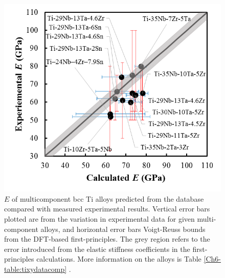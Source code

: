 \pagebreak
\begin{figure}[H]
	\centering
	\includegraphics{Chapter-6/Figures/tixydatabase.png}
	\caption{$E$ of multicomponent bcc Ti alloys predicted from the database compared with measured experimental results. Vertical error bars plotted are from the variation in experimental data for given multi-component alloys, and horizontal error bars Voigt-Reuss bounds from the DFT-based first-principles. The grey region refers to the error introduced from the elastic stiffness coefficients in the first-principles calculations. More information on the alloys is Table \ref{Ch6-table:tixydatacomp} \cite{Mohammed2014,Geetha2009,Tane2010a}.}
	\label{Ch6-figure:tixydatabase}
\end{figure}